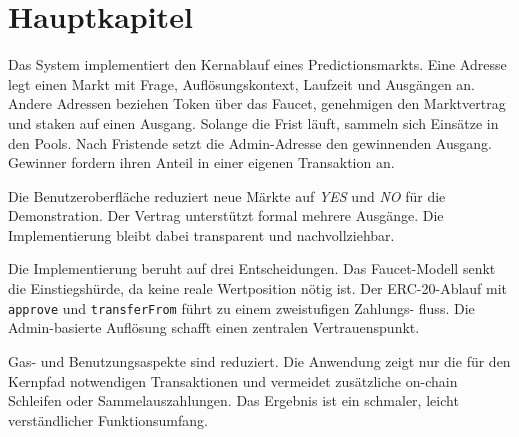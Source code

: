\section{Hauptkapitel}
\label{chap:kern}

Das System implementiert den Kernablauf eines Predictionsmarkts. Eine Adresse legt
einen Markt mit Frage, Auflösungskontext, Laufzeit und Ausgängen an. Andere
Adressen beziehen Token über das Faucet, genehmigen den Marktvertrag und staken
auf einen Ausgang. Solange die Frist läuft, sammeln sich Einsätze in den Pools.
Nach Fristende setzt die Admin-Adresse den gewinnenden Ausgang. Gewinner fordern
ihren Anteil in einer eigenen Transaktion an.

Die Benutzeroberfläche reduziert neue Märkte auf \emph{YES} und \emph{NO} für
die Demonstration. Der Vertrag unterstützt formal mehrere Ausgänge. Die
Implementierung bleibt dabei transparent und nachvollziehbar.

Die Implementierung beruht auf drei Entscheidungen. Das Faucet-Modell senkt die
Einstiegshürde, da keine reale Wertposition nötig ist. Der ERC-20-Ablauf mit
\texttt{approve} und \texttt{transferFrom} führt zu einem zweistufigen Zahlungs-
fluss. Die Admin-basierte Auflösung schafft einen zentralen Vertrauenspunkt.

Gas- und Benutzungsaspekte sind reduziert. Die Anwendung zeigt nur die für den
Kernpfad notwendigen Transaktionen und vermeidet zusätzliche on-chain Schleifen
oder Sammelauszahlungen. Das Ergebnis ist ein schmaler, leicht verständlicher
Funktionsumfang.
